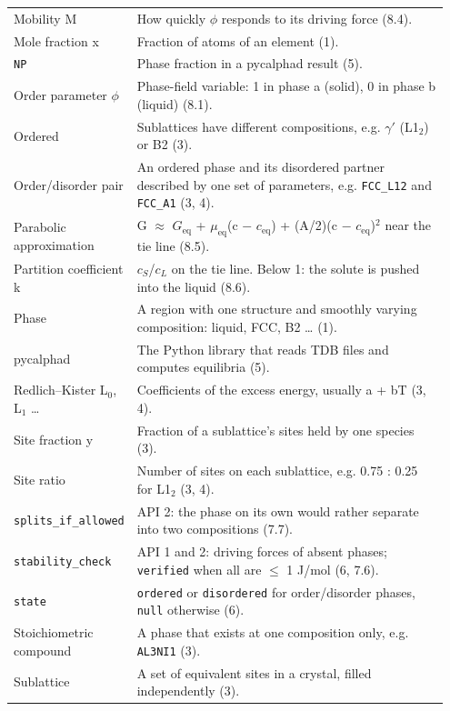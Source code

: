 \documentclass[12pt,a4paper]{article}
\begin{document}
\begin{longtable}{>{\raggedright\arraybackslash}p{0.202\linewidth}>{\raggedright\arraybackslash}p{0.745\linewidth}}
Mobility M & How quickly \(\phi\) responds to its driving force (8.4). \\
Mole fraction x & Fraction of atoms of an element (1). \\
\texttt{NP} & Phase fraction in a pycalphad result (5). \\
Order parameter \(\phi\) & Phase-field variable: 1 in phase a (solid), 0 in phase b (liquid) (8.1). \\
Ordered & Sublattices have different compositions, e.g. \(\gamma '\) (L1\(_{2}\)) or B2 (3). \\
Order/disorder pair & An ordered phase and its disordered partner described by one set of parameters, e.g. \texttt{FCC\_\allowbreak{}L12} and \texttt{FCC\_\allowbreak{}A1} (3, 4). \\
Parabolic approximation & G \(\approx\) \(G_{\mathrm{eq}}\) + \(\mu_{\mathrm{eq}}\)(c \(-\) \(c_{\mathrm{eq}}\)) + (A/2)(c \(-\) \(c_{\mathrm{eq}}\))\(^{2}\) near the tie line (8.5). \\
Partition coefficient k & \(c_{S}\)/\(c_{L}\) on the tie line. Below 1: the solute is pushed into the liquid (8.6). \\
Phase & A region with one structure and smoothly varying composition: liquid, FCC, B2 \ldots{} (1). \\
pycalphad & The Python library that reads TDB files and computes equilibria (5). \\
Redlich--Kister L\(_{0}\), L\(_{1}\) \ldots{} & Coefficients of the excess energy, usually a + bT (3, 4). \\
Site fraction y & Fraction of a sublattice's sites held by one species (3). \\
Site ratio & Number of sites on each sublattice, e.g. 0.75 : 0.25 for L1\(_{2}\) (3, 4). \\
\texttt{splits\_\allowbreak{}if\_\allowbreak{}allowed} & API 2: the phase on its own would rather separate into two compositions (7.7). \\
\texttt{stability\_\allowbreak{}check} & API 1 and 2: driving forces of absent phases; \texttt{verified} when all are \(\le\) 1 J/mol (6, 7.6). \\
\texttt{state} & \texttt{ordered} or \texttt{disordered} for order/disorder phases, \texttt{null} otherwise (6). \\
Stoichiometric compound & A phase that exists at one composition only, e.g. \texttt{AL3NI1} (3). \\
Sublattice & A set of equivalent sites in a crystal, filled independently (3). \\

\end{longtable}
\end{document}
